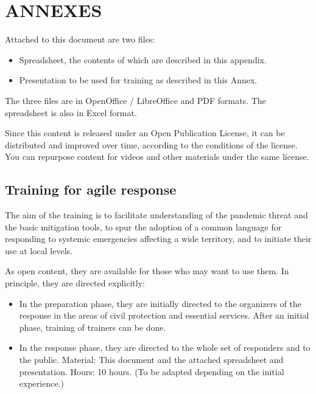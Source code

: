 \documentclass[12pt, a4]{scrartcl}
\begin{document}
\section{ANNEXES}
Attached to this document are two files:
\begin{itemize}
	\item Spreadsheet, the contents of which are described in this appendix.
	\item Presentation to be used for training as described in this Annex.
\end{itemize}

The three files are in OpenOffice / LibreOffice and PDF formats. The spreadsheet is also in Excel format.

Since this content is released under an Open Publication License, it can be distributed and improved over time, according to the conditions of the license. You can repurpose content for videos and other materials under the same license.

\subsection{Training for agile response}
The aim of the training is to facilitate understanding of the pandemic threat and the basic mitigation tools, to spur the adoption of a common language for responding to systemic emergencies affecting a wide territory, and to initiate their use at local levels.

As open content, they are available for those who may want to use them. In principle, they are directed explicitly:
\begin{itemize}
	\item In the preparation phase, they are initially directed to the organizers of the response in the areas of civil protection and essential services. After an initial phase, training of trainers can be done.
	\item In the response phase, they are directed to the whole set of responders and to the public. Material: This document and the attached spreadsheet and presentation.
Hours: 10 hours. (To be adapted depending on the initial experience.)
\end{itemize}
\end{document}
